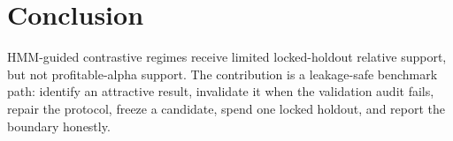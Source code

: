 \documentclass[sigconf,anonymous,review]{acmart}
\begin{document}
\section{Conclusion}
HMM-guided contrastive regimes receive limited locked-holdout relative support, but not profitable-alpha support. The contribution is a leakage-safe benchmark path: identify an attractive result, invalidate it when the validation audit fails, repair the protocol, freeze a candidate, spend one locked holdout, and report the boundary honestly.



\end{document}
